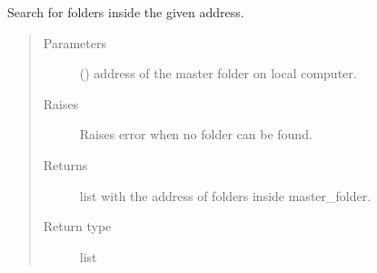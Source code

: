 \documentclass[letterpaper,10pt,english]{sphinxmanual}
\begin{document}
\begin{fulllineitems}
\label{\detokenize{tes:tes.folder_management.find_folders}}
\sphinxAtStartPar
Search for folders inside the given address.
\begin{quote}\begin{description}
\item[{Parameters}] \leavevmode
\sphinxAtStartPar
{} () \textendash{} address of the master folder on local computer.

\item[{Raises}] \leavevmode
\sphinxAtStartPar
{} \textendash{} Raises error when no folder can be found.

\item[{Returns}] \leavevmode
\sphinxAtStartPar
{} \textendash{} list with the address of folders inside master\_folder.

\item[{Return type}] \leavevmode
\sphinxAtStartPar
list

\end{description}\end{quote}

\end{fulllineitems}

\end{document}
